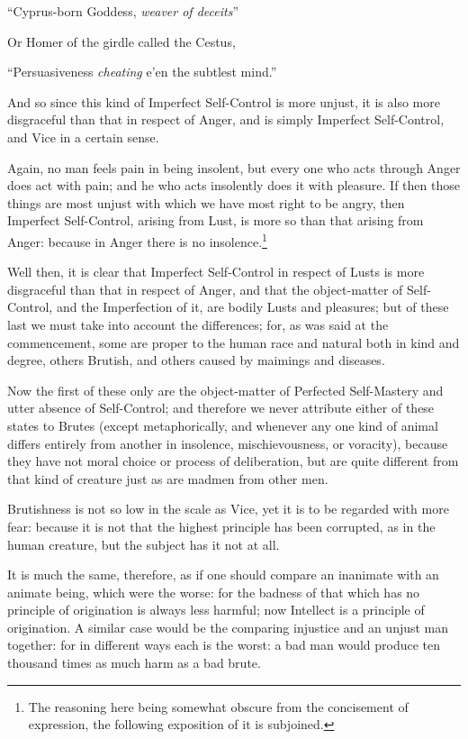 “Cyprus-born Goddess, \emph{weaver of deceits}”

Or Homer of the girdle called the Cestus,

“Persuasiveness \emph{cheating} e’en the subtlest mind.”

And so since this kind of Imperfect Self-Control is more unjust, it is also
more disgraceful than that in respect of Anger, and is simply Imperfect
Self-Control, and Vice in a certain sense.

Again, no man feels pain in being insolent, but every one who acts through
Anger does act with pain; and he who acts insolently does it with pleasure. If
then those things are most unjust with which we have most right to be angry,
then Imperfect Self-Control, arising from Lust, is more so than that arising
from Anger: because in Anger there is no
insolence.\footnote{The reasoning here being somewhat obscure from the concisement of expression,
the following exposition of it is subjoined.}

Well then, it is clear that Imperfect Self-Control in respect of Lusts is more
disgraceful than that in respect of Anger, and that the object-matter of
Self-Control, and the Imperfection of it, are bodily Lusts and pleasures; but
of these last we must take into account the differences; for, as was said at
the commencement, some are proper to the human race and natural both in kind
and degree, others Brutish, and others caused by maimings and diseases.

Now the first of these only are the object-matter of Perfected Self-Mastery and
utter absence of Self-Control; and therefore we never attribute either of these
states to Brutes (except metaphorically, and whenever any one kind of animal
differs entirely from another in insolence, mischievousness, or voracity),
because they have not moral choice or process of deliberation, but are quite
different from that kind of creature just as are madmen from other men.

Brutishness is not so low in the scale as Vice, yet it is to be regarded with
more fear: because it is not that the highest principle has been corrupted, as
in the human creature, but the subject has it not at all.

It is much the same, therefore, as if one should compare an inanimate with an
animate being, which were the worse: for the badness of that which has no
principle of origination is always less harmful; now Intellect is a principle
of origination. A similar case would be the comparing injustice and an unjust
man together: for in different ways each is the worst: a bad man would produce
ten thousand times as much harm as a bad brute.

